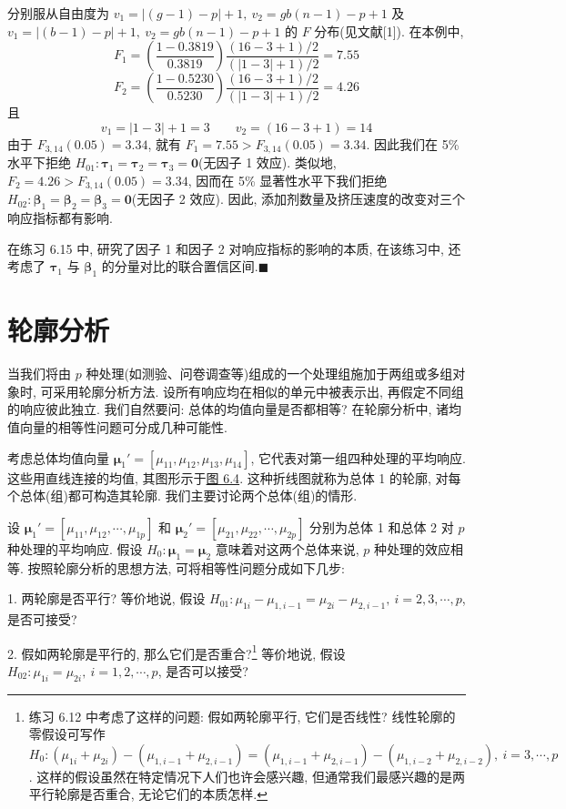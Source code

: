 分别服从自由度为 $v_1=|(g-1)-p|+1,\ v_2=gb(n-1)-p+1$ 及 $v_1=|(b-1)-p|+1,\ v_2=gb(n-1)-p+1$ 的 $F$ 分布(见文献[1]). 在本例中,
\[
F_1=\left(\frac{1-0.3819}{0.3819}\right)\frac{(16-3+1)/2}{(|1-3|+1)/2}=7.55
\]
\[
F_2=\left(\frac{1-0.5230}{0.5230}\right)\frac{(16-3+1)/2}{(|1-3|+1)/2}=4.26
\]
且
\[
v_1=|1-3|+1=3 \qquad v_2=(16-3+1)=14
\]
由于 $F_{3,14}(0.05)=3.34$, 就有 $F_1=7.55>F_{3,14}(0.05)=3.34$. 因此我们在 5\% 水平下拒绝 $H_{01}: \boldsymbol{\tau}_1=\boldsymbol{\tau}_2=\boldsymbol{\tau}_3=\mathbf{0}$(无因子 1 效应). 类似地, $F_2=4.26>F_{3,14}(0.05)=3.34$, 因而在 5\% 显著性水平下我们拒绝 $H_{02}: \boldsymbol{\beta}_1=\boldsymbol{\beta}_2=\boldsymbol{\beta}_3=\mathbf{0}$(无因子 2 效应). 因此, 添加剂数量及挤压速度的改变对三个响应指标都有影响.

在练习 6.15 中, 研究了因子 1 和因子 2 对响应指标的影响的本质, 在该练习中, 还考虑了 $\boldsymbol{\tau}_1$ 与 $\boldsymbol{\beta}_1$ 的分量对比的联合置信区间.\hfill$\blacksquare$

\section{轮廓分析}  %
\label{sec:6.8}

当我们将由 $p$ 种处理(如测验、问卷调查等)组成的一个处理组施加于两组或多组对象时, 可采用轮廓分析方法. 设所有响应均在相似的单元中被表示出, 再假定不同组的响应彼此独立. 我们自然要问: 总体的均值向量是否都相等? 在轮廓分析中, 诸均值向量的相等性问题可分成几种可能性.

考虑总体均值向量 $\boldsymbol{\mu}_1'=[\mu_{11},\mu_{12},\mu_{13},\mu_{14}]$, 它代表对第一组四种处理的平均响应. 这些用直线连接的均值, 其图形示于\hyperref[fig:6.4]{图 6.4}. 这种折线图就称为总体 1 的轮廓, 对每个总体(组)都可构造其轮廓. 我们主要讨论两个总体(组)的情形.

设 $\boldsymbol{\mu}_1'=[\mu_{11},\mu_{12},\cdots,\mu_{1p}]$ 和 $\boldsymbol{\mu}_2'=[\mu_{21},\mu_{22},\cdots,\mu_{2p}]$ 分别为总体 1 和总体 2 对 $p$ 种处理的平均响应. 假设 $H_0: \boldsymbol{\mu}_1=\boldsymbol{\mu}_2$ 意味着对这两个总体来说, $p$ 种处理的效应相等. 按照轮廓分析的思想方法, 可将相等性问题分成如下几步:

1. 两轮廓是否平行? 等价地说, 假设 $H_{01}: \mu_{1i}-\mu_{1,i-1}=\mu_{2i}-\mu_{2,i-1},\ i=2,3,\cdots,p$, 是否可接受?

2. 假如两轮廓是平行的, 那么它们是否重合?\footnote{练习 6.12 中考虑了这样的问题: 假如两轮廓平行, 它们是否线性? 线性轮廓的零假设可写作 $H_0: (\mu_{1i}+\mu_{2i})-(\mu_{1,i-1}+\mu_{2,i-1})=(\mu_{1,i-1}+\mu_{2,i-1})-(\mu_{1,i-2}+\mu_{2,i-2}),\ i=3,\cdots,p$. 这样的假设虽然在特定情况下人们也许会感兴趣, 但通常我们最感兴趣的是两平行轮廓是否重合, 无论它们的本质怎样.} 等价地说, 假设 $H_{02}: \mu_{1i}=\mu_{2i},\ i=1,2,\cdots,p$, 是否可以接受?

